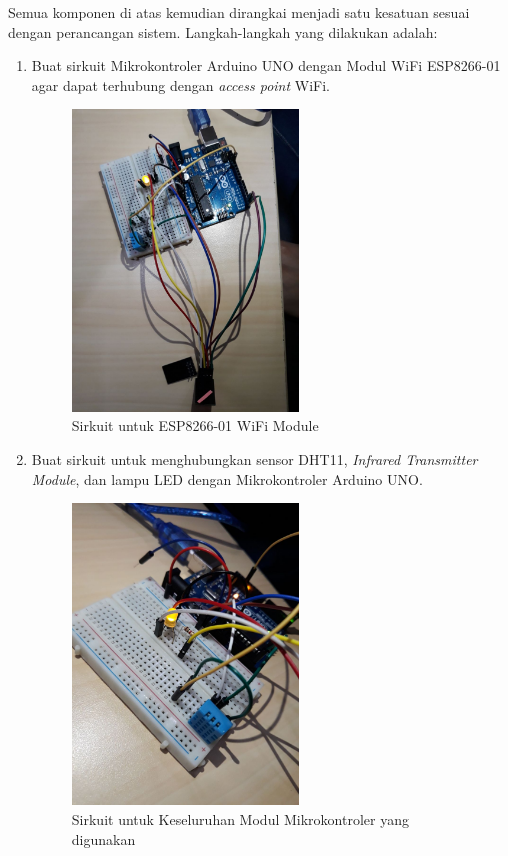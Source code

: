\pagebreak
Semua komponen di atas kemudian dirangkai menjadi satu kesatuan sesuai dengan perancangan sistem. Langkah-langkah yang dilakukan adalah:
\begin{enumerate}
	\item Buat sirkuit Mikrokontroler Arduino UNO dengan Modul WiFi ESP8266-01 agar dapat terhubung dengan \textit{access point} WiFi.
	\begin{figure}[H]
		\centerline {
			\includegraphics[width=6cm]{bab5/img/wifi.jpeg}
		}
		\caption{Sirkuit untuk ESP8266-01 WiFi Module}
		\label{figure:wifi}
	\end{figure}
	\item Buat sirkuit untuk menghubungkan sensor DHT11, \textit{Infrared Transmitter Module}, dan lampu LED dengan Mikrokontroler Arduino UNO.
	\begin{figure}[H]
		\centerline {
			\includegraphics[width=6cm]{bab5/img/sensor.jpeg}
		}
		\caption{Sirkuit untuk Keseluruhan Modul Mikrokontroler yang digunakan}
		\label{figure:sensor}
	\end{figure}
\end{enumerate}

